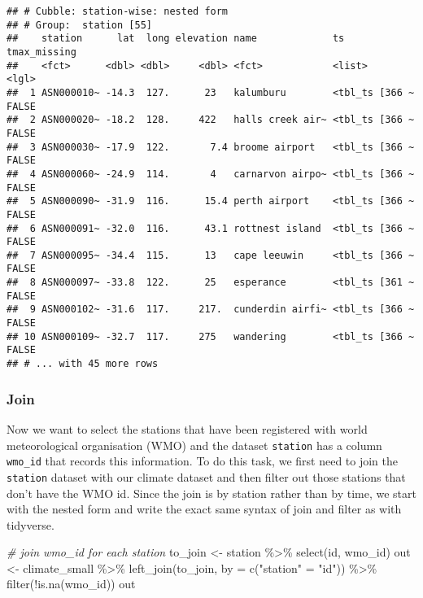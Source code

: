 \documentclass{article}
\newenvironment{Shaded}{\begin{snugshade}}{\end{snugshade}}
\newcommand{\AttributeTok}[1]{\textcolor[rgb]{0.77,0.63,0.00}{#1}}
\newcommand{\CommentTok}[1]{\textcolor[rgb]{0.56,0.35,0.01}{\textit{#1}}}
\newcommand{\FunctionTok}[1]{\textcolor[rgb]{0.00,0.00,0.00}{#1}}
\newcommand{\NormalTok}[1]{#1}
\newcommand{\OtherTok}[1]{\textcolor[rgb]{0.56,0.35,0.01}{#1}}
\newcommand{\SpecialCharTok}[1]{\textcolor[rgb]{0.00,0.00,0.00}{#1}}
\newcommand{\StringTok}[1]{\textcolor[rgb]{0.31,0.60,0.02}{#1}}
\begin{document}
\begin{verbatim}
## # Cubble: station-wise: nested form
## # Group:  station [55]
##    station      lat  long elevation name             ts             tmax_missing
##    <fct>      <dbl> <dbl>     <dbl> <fct>            <list>         <lgl>       
##  1 ASN000010~ -14.3  127.      23   kalumburu        <tbl_ts [366 ~ FALSE       
##  2 ASN000020~ -18.2  128.     422   halls creek air~ <tbl_ts [366 ~ FALSE       
##  3 ASN000030~ -17.9  122.       7.4 broome airport   <tbl_ts [366 ~ FALSE       
##  4 ASN000060~ -24.9  114.       4   carnarvon airpo~ <tbl_ts [366 ~ FALSE       
##  5 ASN000090~ -31.9  116.      15.4 perth airport    <tbl_ts [366 ~ FALSE       
##  6 ASN000091~ -32.0  116.      43.1 rottnest island  <tbl_ts [366 ~ FALSE       
##  7 ASN000095~ -34.4  115.      13   cape leeuwin     <tbl_ts [366 ~ FALSE       
##  8 ASN000097~ -33.8  122.      25   esperance        <tbl_ts [361 ~ FALSE       
##  9 ASN000102~ -31.6  117.     217.  cunderdin airfi~ <tbl_ts [366 ~ FALSE       
## 10 ASN000109~ -32.7  117.     275   wandering        <tbl_ts [366 ~ FALSE       
## # ... with 45 more rows
\end{verbatim}

\hypertarget{join}{%
\subsubsection{Join}\label{join}}

Now we want to select the stations that have been registered with world
meteorological organisation (WMO) and the dataset \texttt{station} has a
column \texttt{wmo\_id} that records this information. To do this task,
we first need to join the \texttt{station} dataset with our climate
dataset and then filter out those stations that don't have the WMO id.
Since the join is by station rather than by time, we start with the
nested form and write the exact same syntax of join and filter as with
tidyverse.

\begin{Shaded}
\begin{Highlighting}[]
\CommentTok{\# join wmo\_id for each station}
\NormalTok{to\_join }\OtherTok{\textless{}{-}}\NormalTok{ station }\SpecialCharTok{\%\textgreater{}\%} \FunctionTok{select}\NormalTok{(id, wmo\_id)}
\NormalTok{out }\OtherTok{\textless{}{-}}\NormalTok{ climate\_small }\SpecialCharTok{\%\textgreater{}\%} 
  \FunctionTok{left\_join}\NormalTok{(to\_join, }\AttributeTok{by =} \FunctionTok{c}\NormalTok{(}\StringTok{"station"} \OtherTok{=} \StringTok{"id"}\NormalTok{)) }\SpecialCharTok{\%\textgreater{}\%} 
  \FunctionTok{filter}\NormalTok{(}\SpecialCharTok{!}\FunctionTok{is.na}\NormalTok{(wmo\_id))}
\NormalTok{out}
\end{Highlighting}
\end{Shaded}
\end{document}
